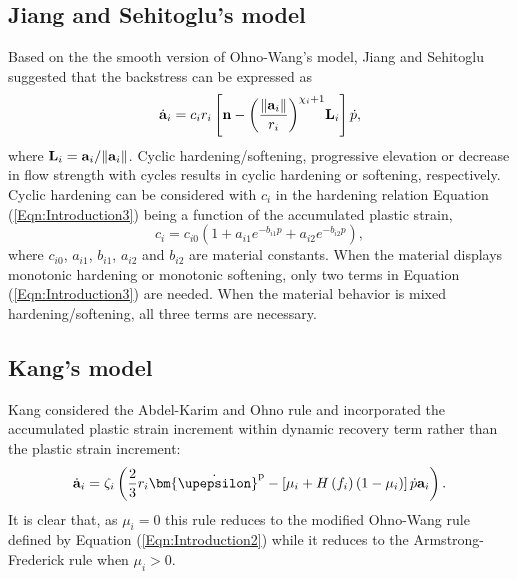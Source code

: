 \subsection{Jiang and Sehitoglu's model}
\noindent
Based on the the smooth version of Ohno-Wang's model, Jiang and Sehitoglu \cite{jiang1996modeling} suggested that the backstress can be expressed as
\begin{equation}
{{\dot{\bf a}}_i} = {c_i}{r_i}\left[ {{\bf{n}} - {{\left( {\frac{{\left\| {{{\bf{a}}_i}} \right\|}}{{{r_i}}}} \right)}^{{\chi _i} + 1}}{{\bf{L}}_i}} \right]\dot p,
\end{equation}
where ${{\bf{L}}_i} = {{{\bf{a}}_i}}/{\left\| {{{\bf{a}}_i}} \right\|}$.
Cyclic hardening/softening, progressive elevation or decrease in flow strength with cycles results in cyclic hardening or softening, respectively.
Cyclic hardening can be considered with $c_i$ in the hardening relation Equation (\ref{Eqn:Introduction3}) being a function of the accumulated plastic strain,
\begin{equation}
{c_i} = {c_{i0}}\left( {1 + {a_{i1}}{e^{ - {b_{i1}}p}} + {a_{i2}}{e^{ - {b_{i2}}p}}} \right),
\label{Eqn:Introduction3}
\end{equation}
where $c_{i0}$, $a_{i1}$, $b_{i1}$, $a_{i2}$ and $b_{i2}$ are material constants.
When the material displays monotonic hardening or monotonic softening, only two terms in Equation (\ref{Eqn:Introduction3}) are needed.
When the material behavior is mixed hardening/softening, all three terms are necessary.

\subsection{Kang's model}
\noindent
Kang \cite{kang2004uniaxial} considered the Abdel-Karim and Ohno rule and incorporated the accumulated plastic strain increment within dynamic recovery term rather than the plastic strain increment:
\begin{equation}
{{\dot{\bf a}}_i} = {\zeta _i}\left( {\frac{2}{3}{r_i}{{{\bm{\dot \upepsilon }}}^{\rm{p}}} - \left[ {{\mu _i} + H\left( {{f_i}} \right)\left( {1 - {\mu _i}} \right)} \right]\dot p{{\bf{a}}_i}} \right).
\end{equation}
It is clear that, as $\mu_i=0$ this rule reduces to the modified Ohno-Wang rule defined by Equation (\ref{Eqn:Introduction2}) while it reduces to the Armstrong-Frederick rule when $\mu_i>0$.

